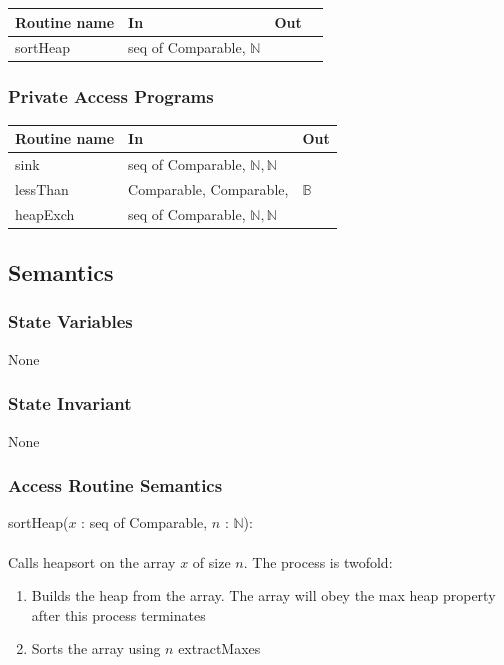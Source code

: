 \documentclass[12pt]{article}
\begin{document}
\begin{tabular}{| l | l | l | l |}
\hline
\textbf{Routine name} & \textbf{In} & \textbf{Out}\\
\hline
sortHeap & seq of Comparable, $\mathbb{N}$ & ~ \\
\hline
\end{tabular}

\subsubsection* {Private Access Programs}

\begin{tabular}{| l | l | l |}
\hline
\textbf{Routine name} & \textbf{In} & \textbf{Out}\\
\hline
sink & seq of Comparable, $\mathbb{N}, \mathbb{N}$ & ~ \\
\hline
lessThan & Comparable, Comparable, & $\mathbb{B}$ \\
\hline
heapExch & seq of Comparable, $\mathbb{N}, \mathbb{N}$ & ~ \\
\hline
\end{tabular}

\subsection* {Semantics}

\subsubsection* {State Variables}

None
\subsubsection* {State Invariant}

None

\subsubsection* {Access Routine Semantics}

sortHeap($x$ : seq of Comparable, $n$ : $\mathbb{N}$):\\\\
Calls heapsort on the array $x$ of size $n$. The process is twofold:
\begin{enumerate}
\item Builds the heap from the array. The array will obey the max heap property
      after this process terminates
\item Sorts the array using $n$ extractMaxes
\end{enumerate}
\end{document}

